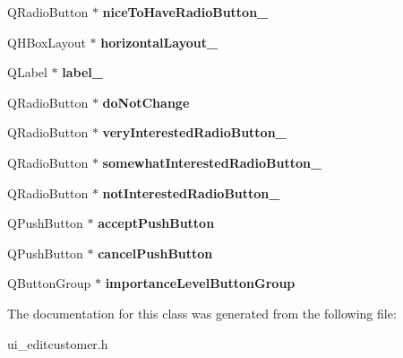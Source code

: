 \begin{DoxyCompactItemize}
\mbox{\label{class_ui___edit_customer_a7064b5d154d21977a52e3c940d705b8f}} 
Q\+Radio\+Button $\ast$ {\bfseries nice\+To\+Have\+Radio\+Button\+\_}
\item 
\mbox{\label{class_ui___edit_customer_ad70328db37f2ca07a9ba4cc86371d372}} 
Q\+H\+Box\+Layout $\ast$ {\bfseries horizontal\+Layout\+\_}
\item 
\mbox{\label{class_ui___edit_customer_adbe9b38b5e83e74560e765e15b70d68b}} 
Q\+Label $\ast$ {\bfseries label\+\_}
\item 
\mbox{\label{class_ui___edit_customer_ac64e20c815fae363513001a3b8e04c28}} 
Q\+Radio\+Button $\ast$ {\bfseries do\+Not\+Change}
\item 
\mbox{\label{class_ui___edit_customer_ae430242eb767c3d0789e17bfa5a625d3}} 
Q\+Radio\+Button $\ast$ {\bfseries very\+Interested\+Radio\+Button\+\_}
\item 
\mbox{\label{class_ui___edit_customer_a231b8a34d15f537dc4ba4db94276cb43}} 
Q\+Radio\+Button $\ast$ {\bfseries somewhat\+Interested\+Radio\+Button\+\_}
\item 
\mbox{\label{class_ui___edit_customer_ac1f4069c6605cd4dba6d3a75d843c1aa}} 
Q\+Radio\+Button $\ast$ {\bfseries not\+Interested\+Radio\+Button\+\_}
\item 
\mbox{\label{class_ui___edit_customer_a763da0880dae27955efe85a02d19a9f8}} 
Q\+Push\+Button $\ast$ {\bfseries accept\+Push\+Button}
\item 
\mbox{\label{class_ui___edit_customer_aab87a34b6a9eaf14fe62ac035c4d0d37}} 
Q\+Push\+Button $\ast$ {\bfseries cancel\+Push\+Button}
\item 
\mbox{\label{class_ui___edit_customer_a6ffdebd20c6fb6eff92fe585d02e5ba4}} 
Q\+Button\+Group $\ast$ {\bfseries importance\+Level\+Button\+Group}
\end{DoxyCompactItemize}


The documentation for this class was generated from the following file\+:\begin{DoxyCompactItemize}
\item 
ui\+\_\+editcustomer.\+h\end{DoxyCompactItemize}
